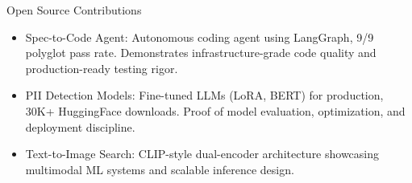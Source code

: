\documentclass{resume} %
\begin{document}
\begin{rSection}{Open Source Contributions}
\begin{itemize}
    \item Spec-to-Code Agent: Autonomous coding agent using LangGraph, 9/9 polyglot pass rate. Demonstrates infrastructure-grade code quality and production-ready testing rigor.
    \item PII Detection Models: Fine-tuned LLMs (LoRA, BERT) for production, 30K+ HuggingFace downloads. Proof of model evaluation, optimization, and deployment discipline.
    \item Text-to-Image Search: CLIP-style dual-encoder architecture showcasing multimodal ML systems and scalable inference design.

\end{itemize}
\end{rSection}
\end{document}

